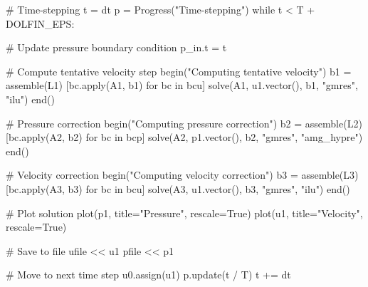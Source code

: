 \documentclass{ansarticle}
\begin{document}
\begin{python}
# Time-stepping
t = dt
p = Progress("Time-stepping")
while t < T + DOLFIN_EPS:

    # Update pressure boundary condition
    p_in.t = t

    # Compute tentative velocity step
    begin("Computing tentative velocity")
    b1 = assemble(L1)
    [bc.apply(A1, b1) for bc in bcu]
    solve(A1, u1.vector(), b1, "gmres", "ilu")
    end()

    # Pressure correction
    begin("Computing pressure correction")
    b2 = assemble(L2)
    [bc.apply(A2, b2) for bc in bcp]
    solve(A2, p1.vector(), b2, "gmres", "amg_hypre")
    end()

    # Velocity correction
    begin("Computing velocity correction")
    b3 = assemble(L3)
    [bc.apply(A3, b3) for bc in bcu]
    solve(A3, u1.vector(), b3, "gmres", "ilu")
    end()

    # Plot solution
    plot(p1, title="Pressure", rescale=True)
    plot(u1, title="Velocity", rescale=True)

    # Save to file
    ufile << u1
    pfile << p1

    # Move to next time step
    u0.assign(u1)
    p.update(t / T)
    t += dt
\end{python}
\end{document}
